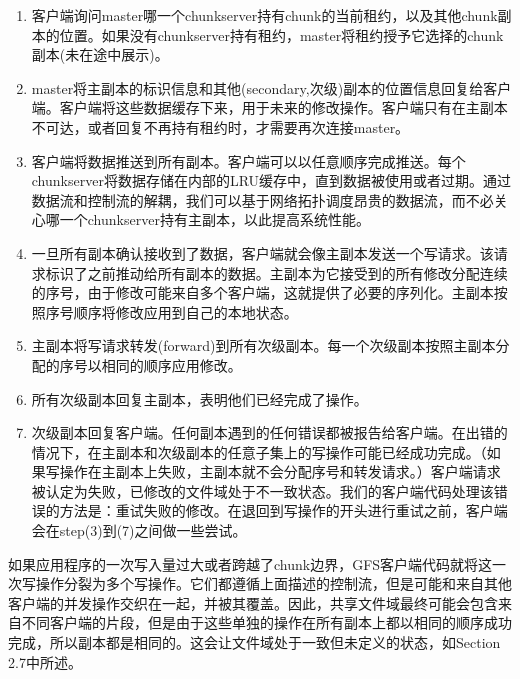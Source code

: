 \documentclass{article}
\begin{document}
\begin{enumerate}
	\item 客户端询问master哪一个chunkserver持有chunk的当前租约，以及其他chunk副本的位置。如果没有chunkserver持有租约，master将租约授予它选择的chunk副本(未在途中展示)。
	\item master将主副本的标识信息和其他(secondary,次级)副本的位置信息回复给客户端。客户端将这些数据缓存下来，用于未来的修改操作。客户端只有在主副本不可达，或者回复不再持有租约时，才需要再次连接master。
	\item 客户端将数据推送到所有副本。客户端可以以任意顺序完成推送。每个chunkserver将数据存储在内部的LRU缓存中，直到数据被使用或者过期。通过数据流和控制流的解耦，我们可以基于网络拓扑调度昂贵的数据流，而不必关心哪一个chunkserver持有主副本，以此提高系统性能。
	\item 一旦所有副本确认接收到了数据，客户端就会像主副本发送一个写请求。该请求标识了之前推动给所有副本的数据。主副本为它接受到的所有修改分配连续的序号，由于修改可能来自多个客户端，这就提供了必要的序列化。主副本按照序号顺序将修改应用到自己的本地状态。
	\item 主副本将写请求转发(forward)到所有次级副本。每一个次级副本按照主副本分配的序号以相同的顺序应用修改。
	\item 所有次级副本回复主副本，表明他们已经完成了操作。
	\item 次级副本回复客户端。任何副本遇到的任何错误都被报告给客户端。在出错的情况下，在主副本和次级副本的任意子集上的写操作可能已经成功完成。（如果写操作在主副本上失败，主副本就不会分配序号和转发请求。）客户端请求被认定为失败，已修改的文件域处于不一致状态。我们的客户端代码处理该错误的方法是：重试失败的修改。在退回到写操作的开头进行重试之前，客户端会在step(3)到(7)之间做一些尝试。
\end{enumerate}
\par
如果应用程序的一次写入量过大或者跨越了chunk边界，GFS客户端代码就将这一次写操作分裂为多个写操作。它们都遵循上面描述的控制流，但是可能和来自其他客户端的并发操作交织在一起，并被其覆盖。因此，共享文件域最终可能会包含来自不同客户端的片段，但是由于这些单独的操作在所有副本上都以相同的顺序成功完成，所以副本都是相同的。这会让文件域处于一致但未定义的状态，如Section 2.7中所述。
\end{document}
